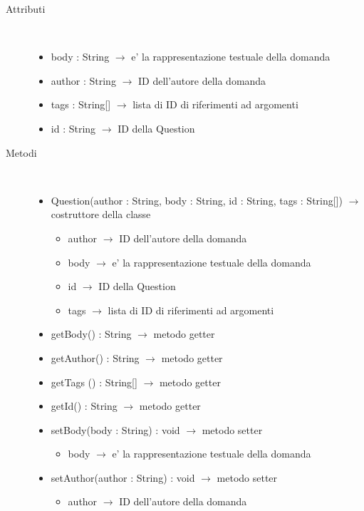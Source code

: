 \begin{description}
\item[Attributi] \hfill \\
\vspace{-7mm}
\begin{itemize}
	\item body : String $\rightarrow$ e' la rappresentazione testuale della domanda
	\item author : String $\rightarrow$ ID dell'autore della domanda
	\item tags  : String[] $\rightarrow$ lista di ID di riferimenti ad argomenti
	\item id : String $\rightarrow$ ID della Question
\end{itemize}

\item[Metodi] \hfill \\
\vspace{-7mm}
\begin{itemize}
	\item Question(author : String, body : String, id : String, tags : String[]) $\rightarrow$ costruttore della classe\begin{itemize}
		\item author $\rightarrow$ ID dell'autore della domanda
		\item body $\rightarrow$ e' la rappresentazione testuale della domanda
		\item id $\rightarrow$ ID della Question
		\item tags $\rightarrow$ lista di ID di riferimenti ad argomenti
	\end{itemize}
	
	\item getBody() : String $\rightarrow$ metodo getter
	\item getAuthor() : String $\rightarrow$ metodo getter
	\item getTags () : String[] $\rightarrow$ metodo getter
	\item getId() : String $\rightarrow$ metodo getter
	\item setBody(body : String) : void $\rightarrow$ metodo setter\begin{itemize}
		\item body $\rightarrow$ e' la rappresentazione testuale della domanda
	\end{itemize}
	
	\item setAuthor(author : String) : void $\rightarrow$ metodo setter\begin{itemize}
		\item author $\rightarrow$ ID dell'autore della domanda
	\end{itemize}
	

\end{itemize}
\end{description}
